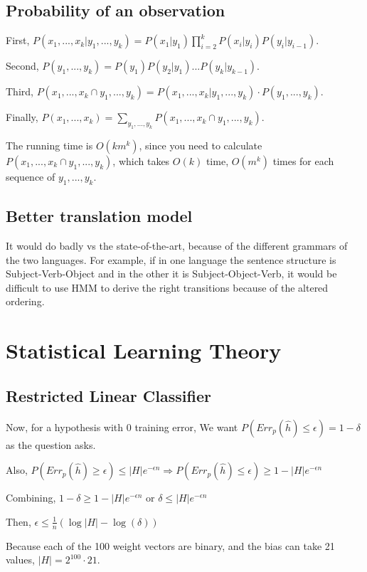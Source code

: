 \documentclass[]{article}
\begin{document}
\subsection{Probability of an observation}

First, $P(x_1,...,x_k|y_1,...,y_k) = P(x_1|y_1) \prod_{i=2}^k P(x_i|y_i)P(y_i|y_{i-1})$.

Second, $P(y_1,...,y_k) = P(y_1)P(y_2|y_1)...P(y_k|y_{k-1})$.

Third, $P(x_1,...,x_k \cap y_1,...,y_k) = P(x_1,...,x_k|y_1,...,y_k) \cdot P(y_1,...,y_k)$.

Finally, $P(x_1,...,x_k) = \sum_{y_1,...,y_k} P(x_1,...,x_k \cap y_1,...,y_k)$.

The running time is $O(km^k)$, since you need to calculate $P(x_1,...,x_k \cap y_1,...,y_k)$, which takes $O(k)$ time, $O(m^k)$ times for each sequence of $y_1,...,y_k$.

\subsection{Better translation model}

It would do badly vs the state-of-the-art, because of the different grammars of the two languages. For example, if in one language the sentence structure is Subject-Verb-Object and in the other it is Subject-Object-Verb, it would be difficult to use HMM to derive the right transitions because of the altered ordering.

\section{Statistical Learning Theory}

\subsection{Restricted Linear Classifier}

Now, for a hypothesis with 0 training error, We want $P(Err_p(\hat h) \le \epsilon) = 1- \delta$ as the question asks.

Also, $P(Err_p(\hat h) \ge \epsilon) \le |H|e^{-\epsilon n} \Rightarrow P(Err_p(\hat h) \le \epsilon) \ge 1 - |H|e^{-\epsilon n}$

Combining, $1-\delta \ge 1 - |H|e^{-\epsilon n}$ or $\delta \le |H|e^{-\epsilon n}$

Then, $\epsilon \le \frac{1}{n}(\log |H| - \log (\delta))$

Because each of the 100 weight vectors are binary, and the bias can take 21 values, $|H| = 2^{100} \cdot 21$.
\end{document}
